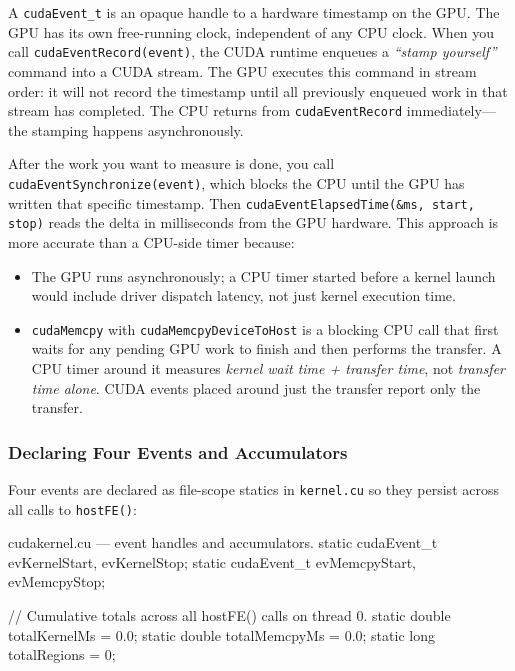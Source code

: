 \documentclass[
	english,
	letterpaper, oneside
]{article}
\begin{document}
A \texttt{cudaEvent\_t} is an opaque handle to a hardware timestamp on the
GPU. The GPU has its own free-running clock, independent of any CPU clock.
When you call \texttt{cudaEventRecord(event)}, the CUDA runtime enqueues a
\emph{``stamp yourself''} command into a CUDA stream. The GPU executes this
command in stream order: it will not record the timestamp until all
previously enqueued work in that stream has completed. The CPU returns from
\texttt{cudaEventRecord} immediately—the stamping happens asynchronously.

After the work you want to measure is done, you call
\texttt{cudaEventSynchronize(event)}, which blocks the CPU until the GPU
has written that specific timestamp. Then \texttt{cudaEventElapsedTime(\&ms,
start, stop)} reads the delta in milliseconds from the GPU hardware. This
approach is more accurate than a CPU-side timer because:

\begin{itemize}
    \item The GPU runs asynchronously; a CPU timer started before a kernel
    launch would include driver dispatch latency, not just kernel execution
    time.
    \item \texttt{cudaMemcpy} with \texttt{cudaMemcpyDeviceToHost} is a
    blocking CPU call that first waits for any pending GPU work to finish
    and then performs the transfer. A CPU timer around it measures
    \emph{kernel wait time + transfer time}, not \emph{transfer time alone}.
    CUDA events placed around just the transfer report only the transfer.
\end{itemize}

\subsubsection{Declaring Four Events and Accumulators}

Four events are declared as file-scope statics in \texttt{kernel.cu} so
they persist across all calls to \texttt{hostFE()}:

\begin{sourcecode}{cuda}{kernel.cu — event handles and accumulators.}
static cudaEvent_t evKernelStart, evKernelStop;
static cudaEvent_t evMemcpyStart,  evMemcpyStop;

// Cumulative totals across all hostFE() calls on thread 0.
static double totalKernelMs = 0.0;
static double totalMemcpyMs = 0.0;
static long   totalRegions  = 0;
\end{sourcecode}
\end{document}

